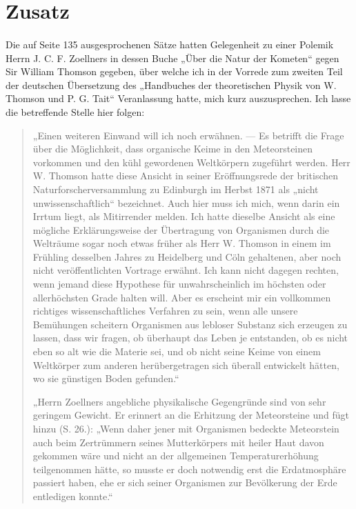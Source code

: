 \documentclass[a4paper, 11pt, oneside, german]{article}
\begin{document}
\section*{Zusatz}
\paragraph{}
Die auf Seite 135 ausgesprochenen Sätze hatten Gelegenheit zu einer Polemik Herrn J. C. F. Zoellners in dessen Buche „Über die Natur der Kometen“ gegen Sir William Thomson gegeben, über welche ich in der Vorrede zum zweiten Teil der deutschen Übersetzung des „Handbuches der theoretischen Physik von W. Thomson und P. G. Tait“ Veranlassung hatte, mich kurz auszusprechen. Ich lasse die betreffende Stelle hier folgen:
\begin{quotation}
„Einen weiteren Einwand will ich noch erwähnen. --- Es betrifft die Frage über die Möglichkeit, dass organische Keime in den Meteorsteinen vorkommen und den kühl gewordenen Weltkörpern zugeführt werden. Herr W. Thomson hatte diese Ansicht in seiner Eröffnungsrede der britischen Naturforscherversammlung zu Edinburgh im Herbst 1871 als „nicht unwissenschaftlich“ bezeichnet. Auch hier muss ich mich, wenn darin ein Irrtum liegt, als Mitirrender melden. Ich hatte dieselbe Ansicht als eine mögliche Erklärungsweise der Übertragung von Organismen durch die Welträume sogar noch etwas früher als Herr W. Thomson in einem im Frühling desselben Jahres zu Heidelberg und Cöln gehaltenen, aber noch nicht veröffentlichten Vortrage erwähnt. Ich kann nicht dagegen rechten, wenn jemand diese Hypothese für unwahrscheinlich im höchsten oder allerhöchsten Grade halten will. Aber es erscheint mir ein vollkommen richtiges wissenschaftliches Verfahren zu sein, wenn alle unsere Bemühungen scheitern Organismen aus lebloser Substanz sich erzeugen zu lassen, dass wir fragen, ob überhaupt das Leben je entstanden, ob es nicht eben so alt wie die Materie sei, und ob nicht seine Keime von einem Weltkörper zum anderen herübergetragen sich überall entwickelt hätten, wo sie günstigen Boden gefunden.“

„Herrn Zoellners angebliche physikalische Gegengründe sind von sehr geringem Gewicht. Er erinnert an die Erhitzung der Meteorsteine und fügt hinzu (S. 26.): „Wenn daher jener mit Organismen bedeckte Meteorstein auch beim Zertrümmern seines Mutterkörpers mit heiler Haut davon gekommen wäre und nicht an der allgemeinen Temperaturerhöhung teilgenommen hätte, so musste er doch notwendig erst die Erdatmosphäre passiert haben, ehe er sich seiner Organismen zur Bevölkerung der Erde entledigen konnte.“


\end{quotation}
\end{document}
